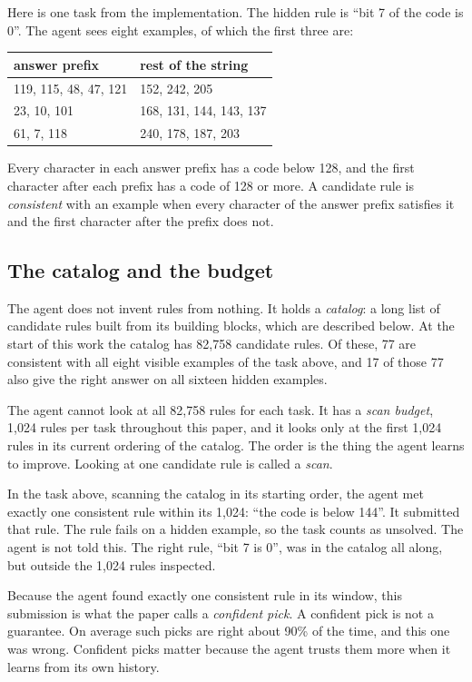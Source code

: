 \documentclass[11pt]{article}
\begin{document}
Here is one task from the implementation. The hidden rule is ``bit 7 of the code is 0''. The agent sees eight examples, of which the first three are:

\begin{center}
\begin{tabular}{ll}
\toprule
answer prefix & rest of the string \\
\midrule
119, 115, 48, 47, 121 & 152, 242, 205 \\
23, 10, 101 & 168, 131, 144, 143, 137 \\
61, 7, 118 & 240, 178, 187, 203 \\
\bottomrule
\end{tabular}
\end{center}

Every character in each answer prefix has a code below 128, and the first character after each prefix has a code of 128 or more. A candidate rule is \emph{consistent} with an example when every character of the answer prefix satisfies it and the first character after the prefix does not.

\subsection{The catalog and the budget}

The agent does not invent rules from nothing. It holds a \emph{catalog}: a long list of candidate rules built from its building blocks, which are described below. At the start of this work the catalog has 82,758 candidate rules. Of these, 77 are consistent with all eight visible examples of the task above, and 17 of those 77 also give the right answer on all sixteen hidden examples.

The agent cannot look at all 82,758 rules for each task. It has a \emph{scan budget}, 1,024 rules per task throughout this paper, and it looks only at the first 1,024 rules in its current ordering of the catalog. The order is the thing the agent learns to improve. Looking at one candidate rule is called a \emph{scan}.

In the task above, scanning the catalog in its starting order, the agent met exactly one consistent rule within its 1,024: ``the code is below 144''. It submitted that rule. The rule fails on a hidden example, so the task counts as unsolved. The agent is not told this. The right rule, ``bit 7 is 0'', was in the catalog all along, but outside the 1,024 rules inspected.

Because the agent found exactly one consistent rule in its window, this submission is what the paper calls a \emph{confident pick}. A confident pick is not a guarantee. On average such picks are right about 90\% of the time, and this one was wrong. Confident picks matter because the agent trusts them more when it learns from its own history.
\end{document}
